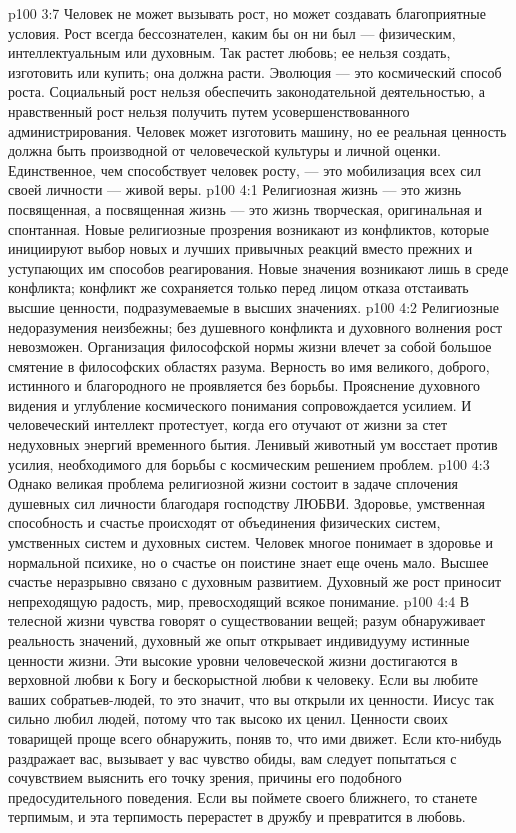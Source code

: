 \vs p100 3:7 Человек не может вызывать рост, но может создавать благоприятные условия. Рост всегда бессознателен, каким бы он ни был --- физическим, интеллектуальным или духовным. Так растет любовь; ее нельзя создать, изготовить или купить; она должна расти. Эволюция --- это космический способ роста. Социальный рост нельзя обеспечить законодательной деятельностью, а нравственный рост нельзя получить путем усовершенствованного администрирования. Человек может изготовить машину, но ее реальная ценность должна быть производной от человеческой культуры и личной оценки. Единственное, чем способствует человек росту, --- это мобилизация всех сил своей личности --- живой веры.
\vs p100 4:1 Религиозная жизнь --- это жизнь посвященная, а посвященная жизнь --- это жизнь творческая, оригинальная и спонтанная. Новые религиозные прозрения возникают из конфликтов, которые инициируют выбор новых и лучших привычных реакций вместо прежних и уступающих им способов реагирования. Новые значения возникают лишь в среде конфликта; конфликт же сохраняется только перед лицом отказа отстаивать высшие ценности, подразумеваемые в высших значениях.
\vs p100 4:2 Религиозные недоразумения неизбежны; без душевного конфликта и духовного волнения рост невозможен. Организация философской нормы жизни влечет за собой большое смятение в философских областях разума. Верность во имя великого, доброго, истинного и благородного не проявляется без борьбы. Прояснение духовного видения и углубление космического понимания сопровождается усилием. И человеческий интеллект протестует, когда его отучают от жизни за стет недуховных энергий временного бытия. Ленивый животный ум восстает против усилия, необходимого для борьбы с космическим решением проблем.
\vs p100 4:3 Однако великая проблема религиозной жизни состоит в задаче сплочения душевных сил личности благодаря господству ЛЮБВИ. Здоровье, умственная способность и счастье происходят от объединения физических систем, умственных систем и духовных систем. Человек многое понимает в здоровье и нормальной психике, но о счастье он поистине знает еще очень мало. Высшее счастье неразрывно связано с духовным развитием. Духовный же рост приносит непреходящую радость, мир, превосходящий всякое понимание.
\vs p100 4:4 \pc В телесной жизни чувства говорят о существовании вещей; разум обнаруживает реальность значений, духовный же опыт открывает индивидууму истинные ценности жизни. Эти высокие уровни человеческой жизни достигаются в верховной любви к Богу и бескорыстной любви к человеку. Если вы любите ваших собратьев\hyp{}людей, то это значит, что вы открыли их ценности. Иисус так сильно любил людей, потому что так высоко их ценил. Ценности своих товарищей проще всего обнаружить, поняв то, что ими движет. Если кто\hyp{}нибудь раздражает вас, вызывает у вас чувство обиды, вам следует попытаться с сочувствием выяснить его точку зрения, причины его подобного предосудительного поведения. Если вы поймете своего ближнего, то станете терпимым, и эта терпимость перерастет в дружбу и превратится в любовь.
